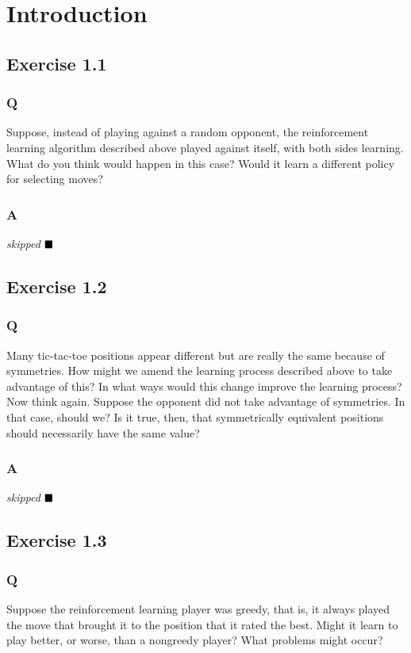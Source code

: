 \section{Introduction}
\subsection{Exercise 1.1}
\subsubsection*{Q}
Suppose, instead of playing against a random opponent, the reinforcement learning algorithm described above played against itself, with both sides learning. What do you think would happen in this case? Would it learn a different policy for selecting moves?
\subsubsection*{A}
\textit{skipped}
$
\hfill \blacksquare
$

\subsection{Exercise 1.2}
\subsubsection*{Q}
Many tic-tac-toe positions appear different but are really the same because of symmetries. How might we amend the learning process described
above to take advantage of this? In what ways would this change improve the learning process? Now think again. Suppose the opponent did not take advantage of symmetries. In that case, should we? Is it true, then, that symmetrically equivalent positions should necessarily have the same value?
\subsubsection*{A}
\textit{skipped}
$
\hfill \blacksquare
$

\subsection{Exercise 1.3}
\subsubsection*{Q}
Suppose the reinforcement learning player was greedy, that is, it always played the move that brought it to the position that it rated the best. Might it learn to play better, or worse, than a nongreedy player? What problems might occur?

